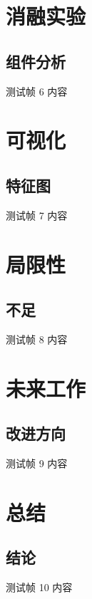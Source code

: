\documentclass[aspectratio=169, hyperref, UTF8, CJK]{beamer}
\begin{document}
\section{消融实验}
\subsection{组件分析}
\begin{frame}{测试帧 6}
  内容
\end{frame}

\section{可视化}
\subsection{特征图}
\begin{frame}{测试帧 7}
  内容
\end{frame}

\section{局限性}
\subsection{不足}
\begin{frame}{测试帧 8}
  内容
\end{frame}

\section{未来工作}
\subsection{改进方向}
\begin{frame}{测试帧 9}
  内容
\end{frame}

\section{总结}
\subsection{结论}
\begin{frame}{测试帧 10}
  内容
\end{frame}
\end{document}
